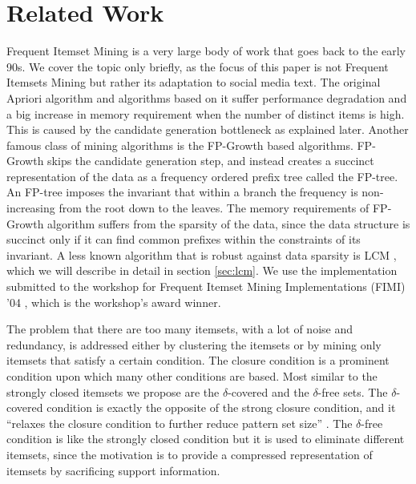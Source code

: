 \documentclass{sig-alternate}
\begin{document}
\section{Related Work}
\label{sec:related}
Frequent Itemset Mining is a very large body of work that goes back to the early 90s. We cover the topic only briefly, as the focus of this paper is not Frequent Itemsets Mining but rather its adaptation to social media text. The original Apriori algorithm \cite{agrawal1994fast} and algorithms based on it suffer performance degradation and a big increase in memory requirement when the number of distinct items is high. This is caused by the candidate generation bottleneck as explained later. Another famous class of mining algorithms is the FP-Growth \cite{han2000mining} based algorithms. FP-Growth  skips the candidate generation step, and instead creates a succinct representation of the data as a frequency ordered prefix tree called the FP-tree. An FP-tree imposes the invariant that within a branch the frequency is non-increasing from the root down to the leaves. 
The memory requirements of FP-Growth algorithm suffers from the sparsity of the data, since the data structure is succinct only if it can find common prefixes within the constraints of its invariant. 
A less known algorithm that is robust against data sparsity is LCM \cite{uno2004lcm}, which we will describe in detail in section \ref{sec:lcm}. We use the implementation submitted to the workshop for Frequent Itemset Mining Implementations (FIMI) '04 \cite{DBLP:conf/fimi/2004}, which is the workshop's award winner. 

The problem that there are too many itemsets, with a lot of noise and redundancy, is addressed either by clustering \cite{yan2005summarizing} the itemsets or by mining only itemsets that satisfy a certain condition. The closure condition \cite{pasquier1999discovering} is a prominent condition upon which many other conditions are based. Most similar to the strongly closed itemsets we  propose are the $\delta$-covered \cite{xin2005mining} and the $\delta$-free \cite{boulicaut2003free} sets. The $\delta$-covered condition is exactly the opposite of the strong closure condition, and it ``relaxes the closure condition to further reduce pattern set size'' \cite{liu2012finding}. The $\delta$-free condition is like the strongly closed condition but it is used to eliminate different itemsets, since the motivation is to provide a compressed representation of itemsets by sacrificing support information. 
\end{document}
